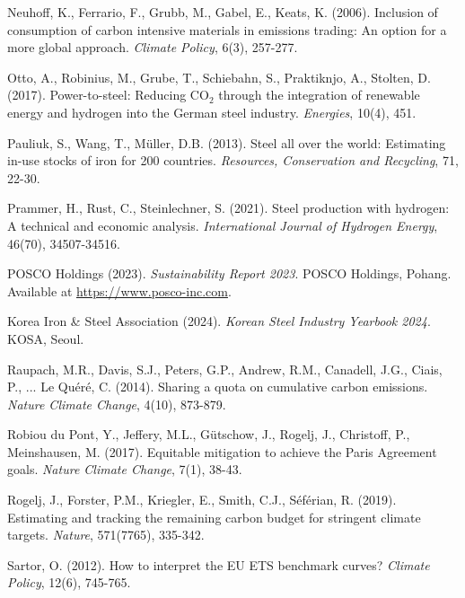 \documentclass[preprint,1p,authoryear]{elsarticle}
\begin{document}
\begin{thebibliography}{99}
 Neuhoff, K., Ferrario, F., Grubb, M., Gabel, E., Keats, K. (2006). Inclusion of consumption of carbon intensive materials in emissions trading: An option for a more global approach. \textit{Climate Policy}, 6(3), 257-277.

 Otto, A., Robinius, M., Grube, T., Schiebahn, S., Praktiknjo, A., Stolten, D. (2017). Power-to-steel: Reducing CO$_2$ through the integration of renewable energy and hydrogen into the German steel industry. \textit{Energies}, 10(4), 451.

 Pauliuk, S., Wang, T., Müller, D.B. (2013). Steel all over the world: Estimating in-use stocks of iron for 200 countries. \textit{Resources, Conservation and Recycling}, 71, 22-30.

 Prammer, H., Rust, C., Steinlechner, S. (2021). Steel production with hydrogen: A technical and economic analysis. \textit{International Journal of Hydrogen Energy}, 46(70), 34507-34516.

 POSCO Holdings (2023). \textit{Sustainability Report 2023}. POSCO Holdings, Pohang. Available at \url{https://www.posco-inc.com}.

 Korea Iron \& Steel Association (2024). \textit{Korean Steel Industry Yearbook 2024}. KOSA, Seoul. 

 Raupach, M.R., Davis, S.J., Peters, G.P., Andrew, R.M., Canadell, J.G., Ciais, P., ... Le Quéré, C. (2014). Sharing a quota on cumulative carbon emissions. \textit{Nature Climate Change}, 4(10), 873-879.

 Robiou du Pont, Y., Jeffery, M.L., Gütschow, J., Rogelj, J., Christoff, P., Meinshausen, M. (2017). Equitable mitigation to achieve the Paris Agreement goals. \textit{Nature Climate Change}, 7(1), 38-43.

 Rogelj, J., Forster, P.M., Kriegler, E., Smith, C.J., Séférian, R. (2019). Estimating and tracking the remaining carbon budget for stringent climate targets. \textit{Nature}, 571(7765), 335-342.

 Sartor, O. (2012). How to interpret the EU ETS benchmark curves? \textit{Climate Policy}, 12(6), 745-765.


\end{thebibliography}
\end{document}

